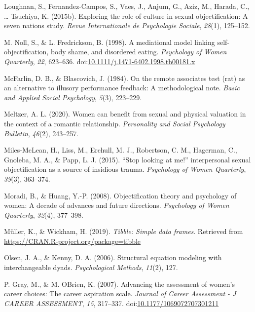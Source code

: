 \documentclass[man]{apa6}
\begin{document}
\hypertarget{ref-loughnan2015}{}
Loughnan, S., Fernandez-Campos, S., Vaes, J., Anjum, G., Aziz, M.,
Harada, C., \ldots{} Tsuchiya, K. (2015b). Exploring the role of culture
in sexual objectification: A seven nations study. \emph{Revue
Internationale de Psychologie Sociale}, \emph{28}(1), 125--152.

\hypertarget{ref-nollfredrickson1998}{}
M. Noll, S., \& L. Fredrickson, B. (1998). A mediational model linking
self-objectification, body shame, and disordered eating.
\emph{Psychology of Women Quarterly}, \emph{22}, 623--636.
doi:\href{https://doi.org/10.1111/j.1471-6402.1998.tb00181.x}{10.1111/j.1471-6402.1998.tb00181.x}

\hypertarget{ref-mcfarlin1984remote}{}
McFarlin, D. B., \& Blascovich, J. (1984). On the remote associates test
(rat) as an alternative to illusory performance feedback: A
methodological note. \emph{Basic and Applied Social Psychology},
\emph{5}(3), 223--229.

\hypertarget{ref-meltzer2020women}{}
Meltzer, A. L. (2020). Women can benefit from sexual and physical
valuation in the context of a romantic relationship. \emph{Personality
and Social Psychology Bulletin}, \emph{46}(2), 243--257.

\hypertarget{ref-miles2015stop}{}
Miles-McLean, H., Liss, M., Erchull, M. J., Robertson, C. M., Hagerman,
C., Gnoleba, M. A., \& Papp, L. J. (2015). ``Stop looking at me!''
interpersonal sexual objectification as a source of insidious trauma.
\emph{Psychology of Women Quarterly}, \emph{39}(3), 363--374.

\hypertarget{ref-moradi2008}{}
Moradi, B., \& Huang, Y.-P. (2008). Objectification theory and
psychology of women: A decade of advances and future directions.
\emph{Psychology of Women Quarterly}, \emph{32}(4), 377--398.

\hypertarget{ref-R-tibble}{}
Müller, K., \& Wickham, H. (2019). \emph{Tibble: Simple data frames}.
Retrieved from \url{https://CRAN.R-project.org/package=tibble}

\hypertarget{ref-olsen2006structural}{}
Olsen, J. A., \& Kenny, D. A. (2006). Structural equation modeling with
interchangeable dyads. \emph{Psychological Methods}, \emph{11}(2), 127.

\hypertarget{ref-grayobrien2007}{}
P. Gray, M., \& M. OBrien, K. (2007). Advancing the assessment of
women's career choices: The career aspiration scale. \emph{Journal of
Career Assessment - J CAREER ASSESSMENT}, \emph{15}, 317--337.
doi:\href{https://doi.org/10.1177/1069072707301211}{10.1177/1069072707301211}
\end{document}
